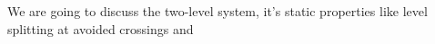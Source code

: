We are going to discuss the two-level system, it's static properties like level splitting at avoided crossings and 